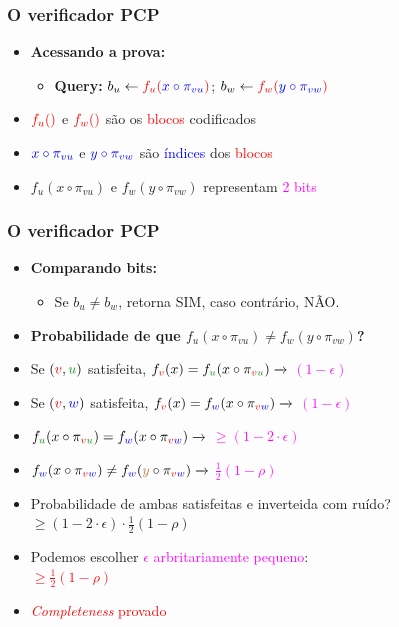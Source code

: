 \documentclass[11pt, handout]{beamer}
\newcommand{\red}[1]{\textcolor{red}{#1}}
\newcommand{\blue}[1]{\textcolor{blue}{#1}}
\newcommand{\green}[1]{\textcolor{pine}{#1}}
\newcommand{\brown}[1]{\textcolor{brown}{#1}}
\newcommand{\mage}[1]{\textcolor{magenta}{#1}}
\begin{document}
\begin{frame}[<+->]
\frametitle{O verificador PCP}
    \begin{itemize}
    \item \textbf{Acessando a prova:} 
        \begin{itemize}
            \item \textbf{Query:} $b_u \leftarrow{} \red{f_u(}\blue{x\circ \pi_{vu}}\red{)}$; $b_w\leftarrow{} \red{f_w(}\blue{y\circ \pi_{vw}}\red{)}$
        \end{itemize}
        \item $\red{f_u()}$ e $\red{f_w()}$ são os \red{blocos} codificados
        \item $\blue{x\circ \pi_{vu}}$ e $\blue{y\circ \pi_{vw}}$ são \blue{índices} dos \red{blocos}
        \item $f_u(x\circ \pi_{vu})$ e $ f_w(y\circ \pi_{vw})$ representam \mage{2 bits}
    \end{itemize}
\end{frame}{}

\begin{frame}[<+->]
\frametitle{O verificador PCP}
    \begin{itemize}
    \item \textbf{Comparando bits:} 
        \begin{itemize}
            \item Se \green{$b_u \ne b_w$}, retorna \green{SIM}, caso contrário, NÃO.
        \end{itemize}
        \item \textbf{Probabilidade de que \green{$f_u(x\circ \pi_{vu}) \ne f_w(y\circ \pi_{vw})$}?}
        \item Se $(\red{v},\green{u})$ satisfeita, $f_{\red{v}}(x) = f_{\green{u}}(x\circ \pi_{\red{v}\green{u}}) \xrightarrow{}$ \mage{$(1- \epsilon)$}
        \item Se $(\red{v},\blue{w})$ satisfeita, $f_{\red{v}}(x) = f_{\blue{w}}(x\circ \pi_{\red{v}\blue{w}}) \xrightarrow{}$ \mage{$(1- \epsilon)$}
        \item $f_{\green{u}}(x\circ \pi_{\red{v}\green{u}}) = f_{\blue{w}}(x\circ \pi_{\red{v}\blue{w}}) \xrightarrow{}$ \mage{$\geq(1-2\cdot \epsilon)$}
        \item $f_{\blue{w}}(x\circ \pi_{\red{v}\blue{w}}) \ne f_{\blue{w}}(\brown{y}\circ \pi_{\red{v}\blue{w}}) \xrightarrow{}$ \mage{$\frac{1}{2}(1-\rho)$}
        \item Probabilidade de ambas satisfeitas e inverteida com ruído?\\
        $\geq (1-2\cdot \epsilon)\cdot \frac{1}{2}(1-\rho)$
        \item Podemos escolher \mage{$\epsilon$ arbritariamente pequeno}:\\
        \red{$\geq \frac{1}{2}(1-\rho)$}
        \item \red{\textit{Completeness} provado}
    \end{itemize}
\end{frame}{}
\end{document}
